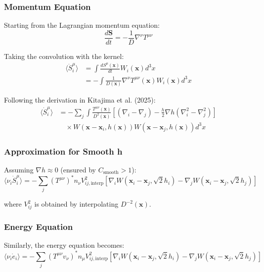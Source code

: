 \documentclass[12pt,a4paper]{article}
\begin{document}
\subsubsection{Momentum Equation}

Starting from the Lagrangian momentum equation:
\begin{equation}
\frac{d\bm{S}}{dt} = -\frac{1}{D} \nabla^\nu T^{\mu\nu}
\end{equation}

Taking the convolution with the kernel:
\begin{align}
\langle \dot{S}_i^\mu \rangle &= \int \frac{d S^\mu(\bm{x})}{dt} W_i(\bm{x}) d^3x \\
&= -\int \frac{1}{D(\bm{x})} \nabla^\nu T^{\mu\nu}(\bm{x}) W_i(\bm{x}) d^3x
\end{align}

Following the derivation in Kitajima et al. (2025):
\begin{align}
\langle \dot{S}_i^\mu \rangle &= -\sum_j \int \frac{T^{\mu\nu}(\bm{x})}{D^2(\bm{x})}
\left[(\nabla_i - \nabla_j) - \frac{h}{2}\nabla h (\nabla_i^2 - \nabla_j^2)\right] \nonumber \\
&\quad \times W(\bm{x}-\bm{x}_i, h(\bm{x})) W(\bm{x}-\bm{x}_j, h(\bm{x})) d^3x
\label{eq:mom_sph_derivation}
\end{align}

\subsubsection{Approximation for Smooth h}

Assuming $\nabla h \approx 0$ (ensured by $C_\text{smooth} > 1$):
\begin{equation}
\langle \nu_i \dot{S}_i^\mu \rangle = -\sum_j (T^{\mu\nu})^* n_\nu V_{ij,\text{interp}}^2
\left[\nabla_i W(\bm{x}_i - \bm{x}_j, \sqrt{2}h_i) - \nabla_j W(\bm{x}_i - \bm{x}_j, \sqrt{2}h_j)\right]
\label{eq:mom_sph}
\end{equation}

where $V_{ij}^2$ is obtained by interpolating $D^{-2}(\bm{x})$.

\subsubsection{Energy Equation}

Similarly, the energy equation becomes:
\begin{equation}
\langle \nu_i \dot{e}_i \rangle = -\sum_j (T^{\mu\nu} v_\nu)^* n_\mu V_{ij,\text{interp}}^2
\left[\nabla_i W(\bm{x}_i - \bm{x}_j, \sqrt{2}h_i) - \nabla_j W(\bm{x}_i - \bm{x}_j, \sqrt{2}h_j)\right]
\label{eq:energy_sph}
\end{equation}
\end{document}
